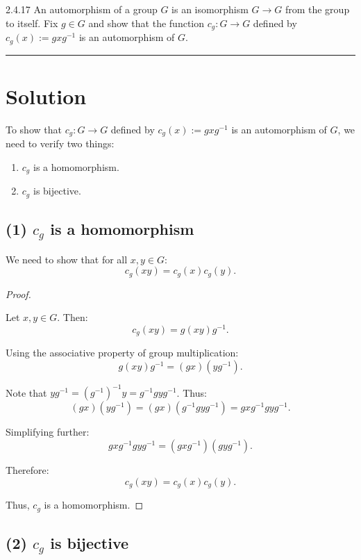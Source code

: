 \documentclass[12pt]{amsart}
\theoremstyle{definition}
\numberwithin{equation}{section}
\begin{document}
\begin{exercise}{2.4.17} An automorphism of a group $G$ is an isomorphism \(G \rightarrow G\) from the group to itself. Fix \(g\in G\) and show that the function \(c_g: G \rightarrow G\) defined by \(c_g(x):=gxg^{-1}\) is an automorphism of $G$.

    \noindent\rule{\linewidth}{1pt}
    
    \section*{Solution}
    
    To show that \(c_g: G \rightarrow G\) defined by \(c_g(x) := gxg^{-1}\) is an automorphism of $G$, we need to verify two things:
    
    \begin{enumerate}
        \item \(c_g\) is a homomorphism.
        \item \(c_g\) is bijective.
    \end{enumerate}
    
    \subsection*{(1) \(c_g\) is a homomorphism}
    
    We need to show that for all \(x, y \in G\):
    \[
    c_g(xy) = c_g(x)c_g(y).
    \]
    
    \begin{proof} \(\)
    
    Let \(x, y \in G\). Then:
    \[
    c_g(xy) = g(xy)g^{-1}.
    \]
    
    Using the associative property of group multiplication:
    \[
    g(xy)g^{-1} = (gx)(yg^{-1}).
    \]
    
    Note that \(yg^{-1} = (g^{-1})^{-1}y = g^{-1}g y g^{-1}\). Thus:
    \[
    (gx)(yg^{-1}) = (gx)(g^{-1}g y g^{-1}) = gxg^{-1}gyg^{-1}.
    \]
    
    Simplifying further:
    \[
    gxg^{-1}gyg^{-1} = (gxg^{-1})(gyg^{-1}).
    \]
    
    Therefore:
    \[
    c_g(xy) = c_g(x)c_g(y).
    \]
    
    Thus, \(c_g\) is a homomorphism.
    
    \end{proof}
    
    \subsection*{(2) \(c_g\) is bijective}
    

\end{exercise}
\end{document}
